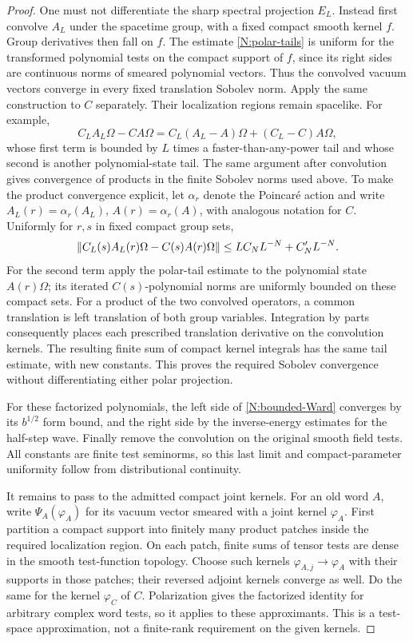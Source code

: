 \begin{proof}
One must not differentiate the sharp spectral projection $E_L$.
Instead first convolve $A_L$ under the spacetime group, with a fixed
compact smooth kernel $f$.  Group derivatives then fall on $f$.
The estimate \eqref{N:polar-tails} is uniform for the transformed
polynomial tests on the compact support of $f$, since its right
sides are continuous norms of smeared polynomial vectors.  Thus
the convolved vacuum vectors converge in every fixed translation
Sobolev norm.  Apply the same construction to $C$ separately.
Their localization regions remain spacelike.  For example,
\[
 C_LA_L\Omega-CA\Omega
 =C_L(A_L-A)\Omega+(C_L-C)A\Omega,
\]
whose first term is bounded by $L$ times a faster-than-any-power
tail and whose second is another polynomial-state tail.  The same
argument after convolution gives convergence of products in the
finite Sobolev norms used above.  To make the product convergence explicit, let $\alpha_r$ denote the
Poincar\'e action and write $A_L(r)=\alpha_r(A_L)$,
$A(r)=\alpha_r(A)$, with analogous notation for $C$. Uniformly for
$r,s$ in fixed compact group sets,
\[
 \left\lVert C_L(s)A_L(r)\Omega-C(s)A(r)\Omega\right\rVert
 \leq L C_NL^{-N}+C_N'L^{-N}.
\]
For the second term apply the polar-tail estimate to the polynomial
state $A(r)\Omega$; its iterated $C(s)$-polynomial norms are uniformly
bounded on these compact sets. For a product of the two convolved
operators, a common translation is left translation of both group
variables. Integration by parts consequently places each prescribed
translation derivative on the convolution kernels. The resulting
finite sum of compact kernel integrals has the same tail estimate,
with new constants. This proves the required Sobolev convergence
without differentiating either polar projection.

For these factorized polynomials, the left side of
\eqref{N:bounded-Ward} converges by its $b^{1/2}$ form bound, and
the right side by the inverse-energy estimates for the half-step
wave.  Finally remove the convolution on the original smooth field
tests.  All constants are finite test seminorms, so this last limit
and compact-parameter uniformity follow from distributional
continuity.

It remains to pass to the admitted compact joint kernels. For an old
word $A$, write $\Psi_A(\varphi_A)$ for its vacuum vector smeared with a
joint kernel $\varphi_A$. First partition a compact support into finitely
many product patches inside the required localization region. On each
patch, finite sums of tensor tests are dense in the smooth test-function
topology. Choose such kernels $\varphi_{A,j}\to\varphi_A$ with their supports
in those patches; their reversed adjoint kernels converge as well. Do the
same for the kernel $\varphi_C$ of $C$. Polarization gives the factorized
identity for arbitrary complex word tests, so it applies to these
approximants. This is a test-space approximation, not a finite-rank
requirement on the given kernels.


\end{proof}
